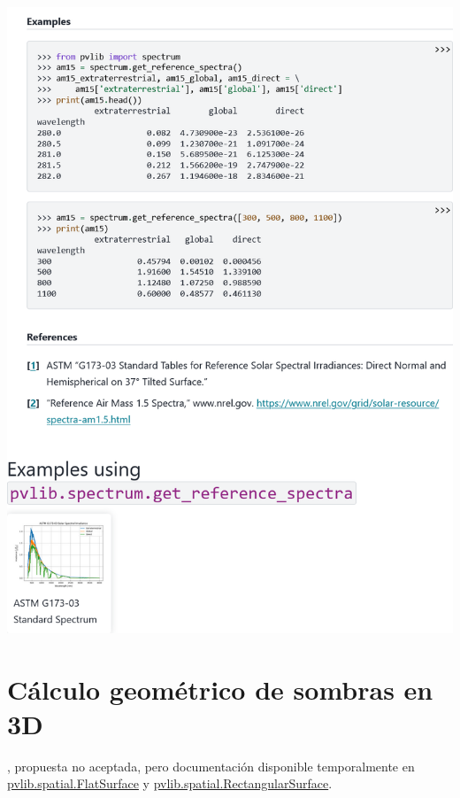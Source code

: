 \begin{myparindent}{0pt}
\includegraphics[width=\linewidth,height=0.9\textheight,keepaspectratio]{images/docs_funcs_cut/get_reference_spectra_1.png}

\newpage\section{Cálculo geométrico de sombras en 3D} \label{sct:doc_sombras_3d}

, propuesta no aceptada, pero documentación disponible temporalmente en \href{https://pvlib-python--2106.org.readthedocs.build/en/2106/reference/generated/pvlib.spatial.FlatSurface.html}{pvlib.spatial.FlatSurface} y \href{https://pvlib-python--2106.org.readthedocs.build/en/2106/reference/generated/pvlib.spatial.RectangularSurface.html}{pvlib.spatial.RectangularSurface}.


\end{myparindent}
